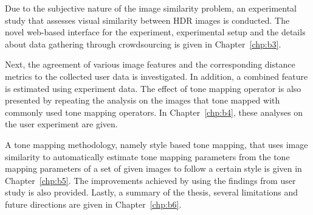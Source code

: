 Due to the subjective nature of the image similarity problem, an experimental study that assesses visual similarity between HDR images is conducted. The novel web-based interface for the experiment, experimental setup and the details about data gathering through crowdsourcing is given in Chapter~\ref{chp:b3}.

Next, the agreement of various image features and the corresponding distance metrics to the collected user data is investigated. In addition, a combined feature is estimated using experiment data. The effect of tone mapping operator is also presented by repeating the analysis on the images that tone mapped with commonly used tone mapping operators. In Chapter~\ref{chp:b4}, these analyses on the user experiment are given.

A tone mapping methodology, namely style based tone mapping, that uses image similarity to automatically estimate tone mapping parameters from the tone mapping parameters of a set of given images to follow a certain style is given in Chapter~\ref{chp:b5}. The improvements achieved by using the findings from user study is also provided.
Lastly, a summary of the thesis, several limitations and future directions are given in Chapter~\ref{chp:b6}.






